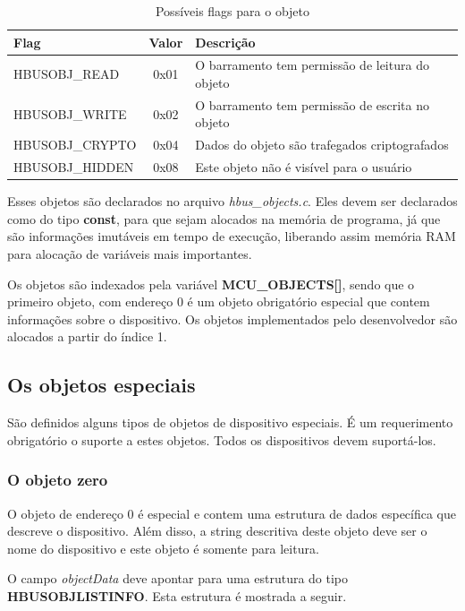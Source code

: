 \documentclass[11pt]{report}
\begin{document}
\begin{table}[H]
\centering
\caption{Possíveis flags para o objeto}
\begin{tabular}{l c l}

\hline
Flag						& 	Valor	&	Descrição\\
\hline
HBUSOBJ\_READ			&	0x01		&	O barramento tem permissão de leitura do objeto\\
HBUSOBJ\_WRITE			&	0x02		&	O barramento tem permissão de escrita no objeto\\
HBUSOBJ\_CRYPTO			&   0x04	    &	Dados do objeto são trafegados criptografados\\
HBUSOBJ\_HIDDEN			&	0x08		&	Este objeto não é visível para o usuário\\
\hline

\end{tabular}
\end{table}

Esses objetos são declarados no arquivo \textit{hbus\_objects.c}. Eles devem ser declarados como do tipo \textbf{const}, para que sejam alocados na memória de programa, já que são informações imutáveis em tempo de execução, liberando assim memória RAM para alocação de variáveis mais importantes.

Os objetos são indexados pela variável \textbf{MCU\_OBJECTS[]}, sendo que o primeiro objeto, com endereço 0 é um objeto obrigatório especial que contem informações sobre o dispositivo. Os objetos implementados pelo desenvolvedor são alocados a partir do índice 1.

\subsection{Os objetos especiais}

São definidos alguns tipos de objetos de dispositivo especiais. É um requerimento obrigatório o suporte a estes objetos. Todos os dispositivos devem suportá-los.

\subsubsection*{O objeto zero}

O objeto de endereço 0 é especial e contem uma estrutura de dados específica que descreve o dispositivo. Além disso, a string descritiva deste objeto deve ser o nome do dispositivo e este objeto é somente para leitura.

O campo \textit{objectData} deve apontar para uma estrutura do tipo \textbf{HBUSOBJLISTINFO}. Esta estrutura é mostrada a seguir.
\end{document}

